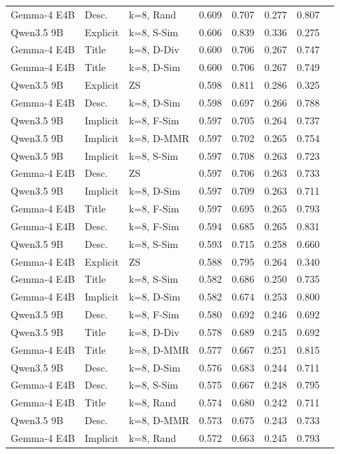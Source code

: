\begin{longtable}{lllrrrrr}
Gemma-4 E4B & Desc. & k=8, Rand & 0.609 & 0.707 & 0.277 & 0.807 \\
Qwen3.5 9B & Explicit & k=8, S-Sim & 0.606 & 0.839 & 0.336 & 0.275 \\
Gemma-4 E4B & Title & k=8, D-Div & 0.600 & 0.706 & 0.267 & 0.747 \\
Gemma-4 E4B & Title & k=8, D-Sim & 0.600 & 0.706 & 0.267 & 0.749 \\
Qwen3.5 9B & Explicit & ZS & 0.598 & 0.811 & 0.286 & 0.325 \\
Gemma-4 E4B & Desc. & k=8, D-Sim & 0.598 & 0.697 & 0.266 & 0.788 \\
Qwen3.5 9B & Implicit & k=8, F-Sim & 0.597 & 0.705 & 0.264 & 0.737 \\
Qwen3.5 9B & Implicit & k=8, D-MMR & 0.597 & 0.702 & 0.265 & 0.754 \\
Qwen3.5 9B & Implicit & k=8, S-Sim & 0.597 & 0.708 & 0.263 & 0.723 \\
Gemma-4 E4B & Desc. & ZS & 0.597 & 0.706 & 0.263 & 0.733 \\
Qwen3.5 9B & Implicit & k=8, D-Sim & 0.597 & 0.709 & 0.263 & 0.711 \\
Gemma-4 E4B & Title & k=8, F-Sim & 0.597 & 0.695 & 0.265 & 0.793 \\
Gemma-4 E4B & Desc. & k=8, F-Sim & 0.594 & 0.685 & 0.265 & 0.831 \\
Qwen3.5 9B & Desc. & k=8, S-Sim & 0.593 & 0.715 & 0.258 & 0.660 \\
Gemma-4 E4B & Explicit & ZS & 0.588 & 0.795 & 0.264 & 0.340 \\
Gemma-4 E4B & Title & k=8, S-Sim & 0.582 & 0.686 & 0.250 & 0.735 \\
Gemma-4 E4B & Implicit & k=8, D-Sim & 0.582 & 0.674 & 0.253 & 0.800 \\
Qwen3.5 9B & Desc. & k=8, F-Sim & 0.580 & 0.692 & 0.246 & 0.692 \\
Qwen3.5 9B & Title & k=8, D-Div & 0.578 & 0.689 & 0.245 & 0.692 \\
Gemma-4 E4B & Title & k=8, D-MMR & 0.577 & 0.667 & 0.251 & 0.815 \\
Qwen3.5 9B & Desc. & k=8, D-Sim & 0.576 & 0.683 & 0.244 & 0.711 \\
Gemma-4 E4B & Desc. & k=8, S-Sim & 0.575 & 0.667 & 0.248 & 0.795 \\
Gemma-4 E4B & Title & k=8, Rand & 0.574 & 0.680 & 0.242 & 0.711 \\
Qwen3.5 9B & Desc. & k=8, D-MMR & 0.573 & 0.675 & 0.243 & 0.733 \\
Gemma-4 E4B & Implicit & k=8, Rand & 0.572 & 0.663 & 0.245 & 0.793 \\

\end{longtable}
